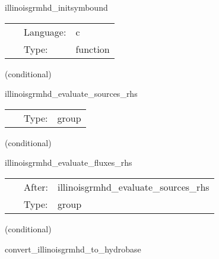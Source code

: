 \hspace{5mm} illinoisgrmhd\_initsymbound 

\hspace{5mm}{\it schedule symmetries } 


\hspace{5mm}

 \begin{tabular*}{160mm}{cll} 
~ & Language:  & c \\ 
~ & Type:  & function \\ 
\end{tabular*} 


\vspace{5mm}

   (conditional) 

\hspace{5mm} illinoisgrmhd\_evaluate\_sources\_rhs 

\hspace{5mm}{\it evaluate source terms in grmhd rhss } 


\hspace{5mm}

 \begin{tabular*}{160mm}{cll} 
~ & Type:  & group \\ 
\end{tabular*} 


\vspace{5mm}

   (conditional) 

\hspace{5mm} illinoisgrmhd\_evaluate\_fluxes\_rhs 

\hspace{5mm}{\it evaluate flux terms in grmhd rhss } 


\hspace{5mm}

 \begin{tabular*}{160mm}{cll} 
~ & After:  & illinoisgrmhd\_evaluate\_sources\_rhs \\ 
~ & Type:  & group \\ 
\end{tabular*} 


\vspace{5mm}

   (conditional) 

\hspace{5mm} convert\_illinoisgrmhd\_to\_hydrobase 

